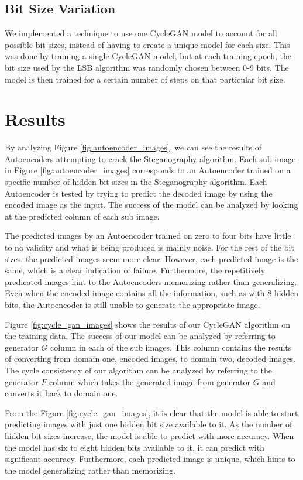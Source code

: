 \documentclass[conference]{IEEEtran}
\begin{document}
\subsection{Bit Size Variation}
We implemented a technique to use one CycleGAN model to account for all possible bit sizes, instead of having to create a unique model for each size. This was done by training a single CycleGAN model, but at each training epoch, the bit size used by the LSB algorithm was randomly chosen between 0-9 bits. The model is then trained for a certain number of steps on that particular bit size.
    
\section{Results}

By analyzing Figure \ref{fig:autoencoder_images}, we can see the results of Autoencoders attempting to crack the Steganography algorithm. Each sub image in Figure \ref{fig:autoencoder_images} corresponds to an Autoencoder trained on a specific number of hidden bit sizes in the Steganography algorithm. Each Autoencoder is tested by trying to predict the decoded image by using the encoded image as the input. The success of the model can be analyzed by looking at the predicted column of each sub image. 

The predicted images by an Autoencoder trained on zero to four bits have little to no validity and what is being produced is mainly noise. For the rest of the bit sizes, the predicted images seem more clear. However, each predicted image is the same, which is a clear indication of failure. Furthermore, the repetitively predicated images hint to the Autoencoders memorizing rather than generalizing. Even when the encoded image contains all the information, such as with 8 hidden bits, the Autoencoder is still unable to generate the appropriate image.

Figure \ref{fig:cycle_gan_images} shows the results of our CycleGAN algorithm on the training data. The success of our model can be analyzed by referring to generator $G$ column in each of the sub images. This column contains the results of converting from domain one, encoded images, to domain two, decoded images. The cycle consistency of our algorithm can be analyzed by referring to the generator $F$ column which takes the generated image from generator $G$ and converts it back to domain one.

From the Figure \ref{fig:cycle_gan_images}, it is clear that the model is able to start predicting images with just one hidden bit size available to it. As the number of hidden bit sizes increase, the model is able to predict with more accuracy. When the model has six to eight hidden bits available to it, it can predict with significant accuracy. Furthermore, each predicted image is unique, which hints to the model generalizing rather than memorizing. 
\end{document}
